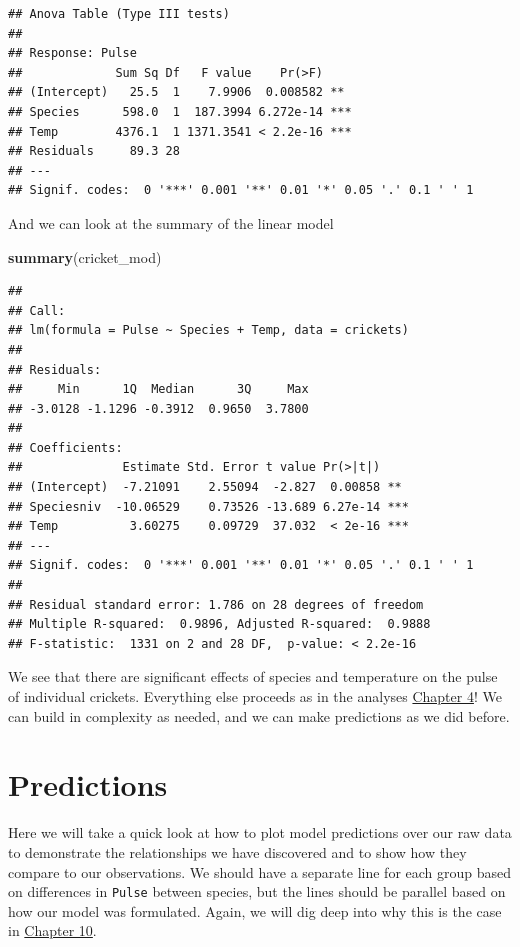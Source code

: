 \documentclass[
]{book}
\newenvironment{Shaded}{\begin{snugshade}}{\end{snugshade}}
\newcommand{\KeywordTok}[1]{\textcolor[rgb]{0.13,0.29,0.53}{\textbf{#1}}}
\newcommand{\NormalTok}[1]{#1}
\begin{document}
\begin{verbatim}
## Anova Table (Type III tests)
## 
## Response: Pulse
##             Sum Sq Df   F value    Pr(>F)    
## (Intercept)   25.5  1    7.9906  0.008582 ** 
## Species      598.0  1  187.3994 6.272e-14 ***
## Temp        4376.1  1 1371.3541 < 2.2e-16 ***
## Residuals     89.3 28                        
## ---
## Signif. codes:  0 '***' 0.001 '**' 0.01 '*' 0.05 '.' 0.1 ' ' 1
\end{verbatim}

And we can look at the summary of the linear model

\begin{Shaded}
\begin{Highlighting}[]
\KeywordTok{summary}\NormalTok{(cricket_mod)}
\end{Highlighting}
\end{Shaded}

\begin{verbatim}
## 
## Call:
## lm(formula = Pulse ~ Species + Temp, data = crickets)
## 
## Residuals:
##     Min      1Q  Median      3Q     Max 
## -3.0128 -1.1296 -0.3912  0.9650  3.7800 
## 
## Coefficients:
##              Estimate Std. Error t value Pr(>|t|)    
## (Intercept)  -7.21091    2.55094  -2.827  0.00858 ** 
## Speciesniv  -10.06529    0.73526 -13.689 6.27e-14 ***
## Temp          3.60275    0.09729  37.032  < 2e-16 ***
## ---
## Signif. codes:  0 '***' 0.001 '**' 0.01 '*' 0.05 '.' 0.1 ' ' 1
## 
## Residual standard error: 1.786 on 28 degrees of freedom
## Multiple R-squared:  0.9896,	Adjusted R-squared:  0.9888 
## F-statistic:  1331 on 2 and 28 DF,  p-value: < 2.2e-16
\end{verbatim}

We see that there are significant effects of species and temperature on the pulse of individual crickets. Everything else proceeds as in the analyses \protect\hyperlink{Chapter4}{Chapter 4}! We can build in complexity as needed, and we can make predictions as we did before.

\hypertarget{predictions}{%
\section{Predictions}\label{predictions}}

Here we will take a quick look at how to plot model predictions over our raw data to demonstrate the relationships we have discovered and to show how they compare to our observations. We should have a separate line for each group based on differences in \texttt{Pulse} between species, but the lines should be parallel based on how our model was formulated. Again, we will dig deep into why this is the case in \protect\hyperlink{Chapter10}{Chapter 10}.
\end{document}
